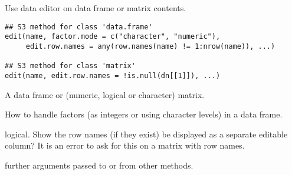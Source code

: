 %
\begin{Description}\relax
Use data editor on data frame or matrix contents.
\end{Description}
%
\begin{Usage}
\begin{verbatim}
## S3 method for class 'data.frame'
edit(name, factor.mode = c("character", "numeric"),
     edit.row.names = any(row.names(name) != 1:nrow(name)), ...)

## S3 method for class 'matrix'
edit(name, edit.row.names = !is.null(dn[[1]]), ...)
\end{verbatim}
\end{Usage}
%
\begin{Arguments}
\begin{ldescription}
\item[\code{name}] A data frame or (numeric, logical or character) matrix.
\item[\code{factor.mode}] How to handle factors (as integers or using
character levels) in a data frame.
\item[\code{edit.row.names}] logical. Show the row names (if they exist) be
displayed as a separate editable column?  It is an error to ask for
this on a matrix with  row names.
\item[\code{...}] further arguments passed to or from other methods.
\end{ldescription}
\end{Arguments}
%
